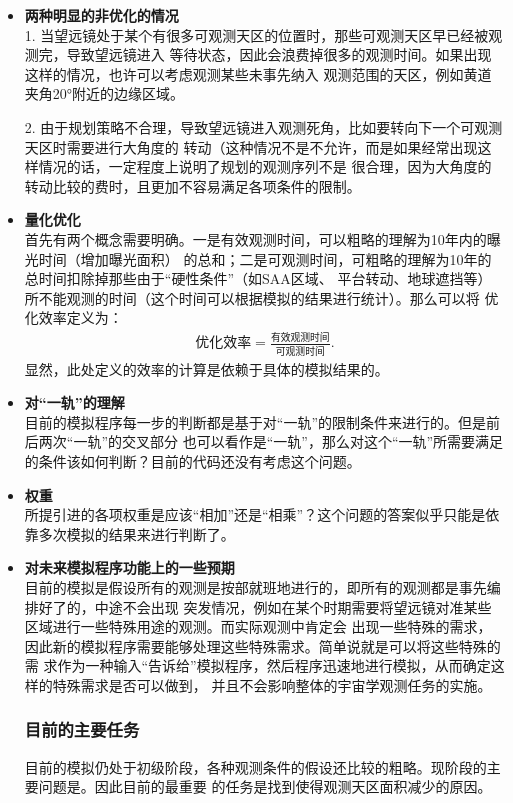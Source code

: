 \begin{itemize}
\item {\textbf{两种明显的非优化的情况}}\\
1. 当望远镜处于某个有很多可观测天区的位置时，那些可观测天区早已经被观测完，导致望远镜进入
等待状态，因此会浪费掉很多的观测时间。如果出现这样的情况，也许可以考虑观测某些未事先纳入
观测范围的天区，例如黄道夹角20°附近的边缘区域。

2. 由于规划策略不合理，导致望远镜进入观测死角，比如要转向下一个可观测天区时需要进行大角度的
转动（这种情况不是不允许，而是如果经常出现这样情况的话，一定程度上说明了规划的观测序列不是
很合理，因为大角度的转动比较的费时，且更加不容易满足各项条件的限制。

\item {\textbf{量化优化}}\\
首先有两个概念需要明确。一是有效观测时间，可以粗略的理解为10年内的曝光时间（增加曝光面积）
的总和；二是可观测时间，可粗略的理解为10年的总时间扣除掉那些由于“硬性条件”（如SAA区域、
平台转动、地球遮挡等）所不能观测的时间（这个时间可以根据模拟的结果进行统计）。那么可以将
优化效率定义为：
\begin{eqnarray}
\text{优化效率} = \frac{\text{有效观测时间}}{\text{可观测时间}}.
\end{eqnarray}
显然，此处定义的效率的计算是依赖于具体的模拟结果的。

\item {\textbf{对“一轨”的理解}}\\
目前的模拟程序每一步的判断都是基于对“一轨”的限制条件来进行的。但是前后两次“一轨”的交叉部分
也可以看作是“一轨”，那么对这个“一轨”所需要满足的条件该如何判断？目前的代码还没有考虑这个问题。

\item {\textbf{权重}}\\
所提引进的各项权重是应该“相加”还是“相乘”？这个问题的答案似乎只能是依靠多次模拟的结果来进行判断了。

\item {\textbf{对未来模拟程序功能上的一些预期}}\\
目前的模拟是假设所有的观测是按部就班地进行的，即所有的观测都是事先编排好了的，中途不会出现
突发情况，例如在某个时期需要将望远镜对准某些区域进行一些特殊用途的观测。而实际观测中肯定会
出现一些特殊的需求，因此新的模拟程序需要能够处理这些特殊需求。简单说就是可以将这些特殊的需
求作为一种输入“告诉给”模拟程序，然后程序迅速地进行模拟，从而确定这样的特殊需求是否可以做到，
并且不会影响整体的宇宙学观测任务的实施。

\subsubsection{目前的主要任务}
目前的模拟仍处于初级阶段，各种观测条件的假设还比较的粗略。现阶段的主要问题是。因此目前的最重要
的任务是找到使得观测天区面积减少的原因。



\end{itemize}

